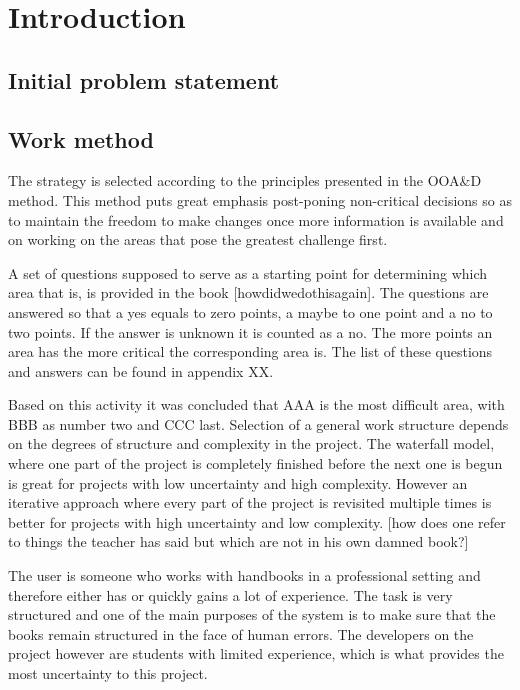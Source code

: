 \chapter{Introduction}
\section{Initial problem statement}
\section{Work method}
The strategy is selected according to the principles presented in the OOA\&D method. This method puts great emphasis post-poning non-critical decisions so as to maintain the freedom to make changes once more information is available and on working on the areas that pose the greatest challenge first. %

A set of questions supposed to serve as a starting point for determining which area that is, is provided in the book [howdidwedothisagain]. The questions are answered so that a yes equals to zero points, a maybe to one point and a no to two points. If the answer is unknown it is counted as a no. The more points an area has the more critical the corresponding area is. The list of these questions and answers can be found in appendix XX.

Based on this activity it was concluded that AAA is the most difficult area, with BBB as number two and CCC last.
Selection of a general work structure depends on the degrees of structure and complexity in the project. The waterfall model, where one part of the project is completely finished before the next one is begun is great for projects with low uncertainty and high complexity. However an iterative approach where every part of the project is revisited  multiple times is better for projects with high uncertainty and low complexity. [how does one refer to things the teacher has said but which are not in his own damned book?] %

The user is someone who works with handbooks in a professional setting and therefore either has or quickly gains a lot of experience. The task is very structured and one of the main purposes of the system is to make sure that the books remain structured in the face of human errors. The developers on the project however are students with limited experience, which is what provides the most uncertainty to this project. %

